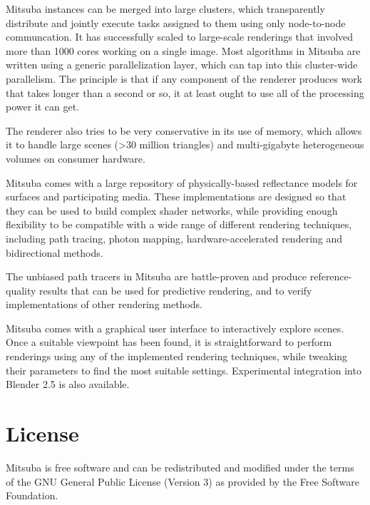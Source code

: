  Mitsuba instances can be merged into large clusters, which transparently distribute and 
jointly execute tasks assigned to them using only node-to-node communcation. It has successfully
scaled to large-scale renderings that involved more than 1000 cores working on a single image.
Most algorithms in Mitsuba  are written using a generic parallelization layer, which can tap 
into this cluster-wide parallelism. The principle is that if any component of the renderer produces
work that takes longer than a second or so, it at least ought to use all of the processing power 
it can get.

The renderer also tries to be very conservative in its use of memory, which allows it to handle 
large scenes (>30 million triangles) and multi-gigabyte heterogeneous volumes on consumer hardware.

 Mitsuba comes with a large repository of physically-based
reflectance models for surfaces and participating media. These implementations
are designed so that they can be used to build complex shader networks, while
providing enough flexibility to be compatible with a wide range of different
rendering techniques, including path tracing, photon mapping, hardware-accelerated rendering 
and bidirectional methods.

The unbiased path tracers in Mitsuba are battle-proven and produce 
reference-quality results that can be used for predictive rendering, and to verify 
implementations of other rendering methods. 

Mitsuba comes with a graphical user interface to interactively explore scenes. Once a suitable 
viewpoint has been found, it is straightforward to perform renderings using any of the 
implemented rendering techniques, while tweaking their parameters to find the most suitable 
settings. Experimental integration into Blender 2.5 is also available.

\section{License}
Mitsuba is free software and can be redistributed and modified under the terms of the GNU General 
Public License (Version 3) as provided by the Free Software Foundation.

